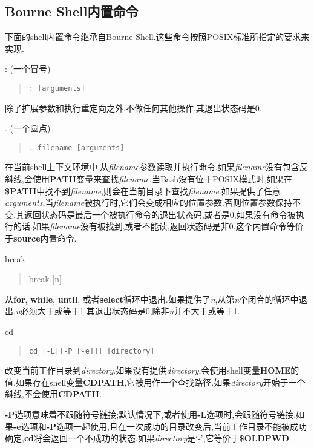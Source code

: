 \documentclass[draft,openany]{book}
\begin{document}
\begin{CJK}{UTF8}{gbsn}
    \section{Bourne Shell内置命令}
    下面的shell内置命令继承自Bourne Shell.这些命令按照POSIX标准所指定的要求来实现.
    \begin{basedescript}{\desclabelstyle{\nextlinelabel}\desclabelwidth{2.5em}}
    \item[: (一个冒号)]
        \begin{quote}
            \verb+: [arguments]+
        \end{quote}
        除了扩展参数和执行重定向之外,不做任何其他操作.其退出状态码是0.
    \item[. (一个圆点)]
        \begin{quote}
            \verb+. filename [arguments]+
        \end{quote}
        在当前shell上下文环境中,从\emph{filename}参数读取并执行命令.如果\emph{filename}没有包含反斜线,会使用\textbf{PATH}变量来查找\emph{filename}.当Bash没有位于POSIX模式时,如果在\textbf{\$PATH}中找不到\emph{filename},则会在当前目录下查找\emph{filename}.如果提供了任意\emph{arguments},当\emph{filename}被执行时,它们会变成相应的位置参数.否则位置参数保持不变.其返回状态码是最后一个被执行命令的退出状态码,或者是0,如果没有命令被执行的话.如果\emph{filename}没有被找到,或者不能读,返回状态码是非0.这个内置命令等价于\textbf{source}内置命令.
    \item[break]
        \begin{quote}
            break [n]
        \end{quote}
        从\textbf{for}, \textbf{while}, \textbf{until}, 或者\textbf{select}循环中退出.如果提供了\emph{n},从第\emph{n}个闭合的循环中退出.\emph{n}必须大于或等于1.其退出状态码是0,除非\emph{n}并不大于或等于1.
    \item[cd]
        \begin{quote}
            \verb+cd [-L|[-P [-e]]] [directory]+
        \end{quote}
        改变当前工作目录到\emph{directory}.如果没有提供\emph{directory},会使用shell变量\textbf{HOME}的值.如果存在shell变量\textbf{CDPATH},它被用作一个查找路径.如果\emph{directory}开始于一个斜线,不会使用\textbf{CDPATH}.\par
        \textbf{-P}选项意味着不跟随符号链接;默认情况下,或者使用\textbf{-L}选项时,会跟随符号链接.如果\textbf{-e}选项和\textbf{-P}选项一起使用,且在一次成功的目录改变后,当前工作目录不能被成功确定,\textbf{cd}将会返回一个不成功的状态.如果\emph{directory}是`-',它等价于\textbf{\$OLDPWD}.\par

\end{basedescript}
\end{CJK}
\end{document}
